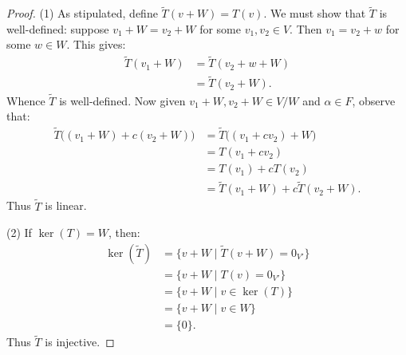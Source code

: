         \begin{proof}
            (1) As stipulated, define $\widetilde{T}(v+W) = T(v)$. We must show that $\widetilde{T}$ is well-defined: suppose $v_1 + W = v_2 + W$ for some $v_1,v_2 \in V$. Then $v_1 = v_2 + w$ for some $w \in W$. This gives:
                \begin{equation*}
                \begin{split}
                    \widetilde{T}(v_1 + W)
                    & = \widetilde{T}(v_2 + w + W) \\
                    & = \widetilde{T}(v_2 + W).
                \end{split}
                \end{equation*}
            Whence $\widetilde{T}$ is well-defined. Now given $v_1 + W, v_2 +W \in V/W$ and $\alpha \in F$, observe that:
                \begin{equation*}
                \begin{split}
                    \widetilde{T}\bigl((v_1 + W) + c (v_2 + W)\bigr)
                    & = \widetilde{T}\bigl( (v_1 + cv_2) + W\bigr) \\
                    & = T(v_1 + cv_2) \\
                    & = T(v_1) + cT(v_2) \\
                    & = \widetilde{T}(v_1 + W) + c \widetilde{T}(v_2 + W). 
                \end{split}
                \end{equation*}
            Thus $\widetilde{T}$ is linear.

            (2) If $\ker(T) = W$, then:
                \begin{equation*}
                \begin{split}
                    \ker(\widetilde{T})
                    & = \{v + W \mid \widetilde{T}(v+W) = 0_{V'}\} \\
                    & = \{v + W \mid T(v) = 0_{V'}\} \\
                    & = \{v + W \mid v \in \ker(T)\} \\
                    & = \{v + W \mid v \in W\} \\
                    & = \{0\}.
                \end{split}
                \end{equation*}
            Thus $\widetilde{T}$ is injective.


\end{proof}
